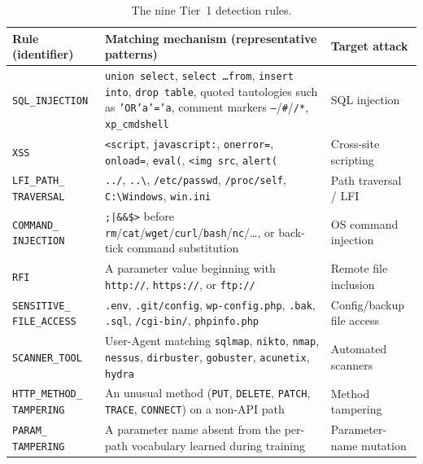 \documentclass[../main.tex]{subfiles}
\begin{document}
\begin{table}[H]
  \centering
  \caption{The nine Tier~1 detection rules.}
  \label{tab:rules}
  \renewcommand{\arraystretch}{1.3}
  \setlength{\tabcolsep}{5pt}
  \footnotesize
  \begin{tabular}{|p{3.2cm}|p{6.6cm}|p{2.6cm}|}
    \hline
    \textbf{Rule (identifier)} & \textbf{Matching mechanism (representative patterns)} & \textbf{Target attack} \\
    \hline
    \texttt{SQL\_INJECTION} & \texttt{union select}, \texttt{select \dots from}, \texttt{insert into}, \texttt{drop table}, quoted tautologies such as \texttt{'OR'a'='a}, comment markers \texttt{--}/\texttt{\#}/\texttt{/*}, \texttt{xp\_cmdshell} & SQL injection \\
    \hline
    \texttt{XSS} & \texttt{<script}, \texttt{javascript:}, \texttt{onerror=}, \texttt{onload=}, \texttt{eval(}, \texttt{<img src}, \texttt{alert(} & Cross-site scripting \\
    \hline
    \texttt{LFI\_PATH\_} \texttt{TRAVERSAL} & \texttt{../}, \texttt{..\textbackslash}, \texttt{/etc/passwd}, \texttt{/proc/self}, \texttt{C:\textbackslash Windows}, \texttt{win.ini} & Path traversal / LFI \\
    \hline
    \texttt{COMMAND\_} \texttt{INJECTION} & \texttt{;|\&\&\$>} before \texttt{rm}/\texttt{cat}/\texttt{wget}/\texttt{curl}/\texttt{bash}/\texttt{nc}/\dots, or back-tick command substitution & OS command injection \\
    \hline
    \texttt{RFI} & A parameter value beginning with \texttt{http://}, \texttt{https://}, or \texttt{ftp://} & Remote file inclusion \\
    \hline
    \texttt{SENSITIVE\_} \texttt{FILE\_ACCESS} & \texttt{.env}, \texttt{.git/config}, \texttt{wp-config.php}, \texttt{.bak}, \texttt{.sql}, \texttt{/cgi-bin/}, \texttt{phpinfo.php} & Config/backup file access \\
    \hline
    \texttt{SCANNER\_TOOL} & User-Agent matching \texttt{sqlmap}, \texttt{nikto}, \texttt{nmap}, \texttt{nessus}, \texttt{dirbuster}, \texttt{gobuster}, \texttt{acunetix}, \texttt{hydra} & Automated scanners \\
    \hline
    \texttt{HTTP\_METHOD\_} \texttt{TAMPERING} & An unusual method (\texttt{PUT}, \texttt{DELETE}, \texttt{PATCH}, \texttt{TRACE}, \texttt{CONNECT}) on a non-API path & Method tampering \\
    \hline
    \texttt{PARAM\_} \texttt{TAMPERING} & A parameter name absent from the per-path vocabulary learned during training & Parameter-name mutation \\
    \hline
  \end{tabular}
\end{table}
\end{document}
